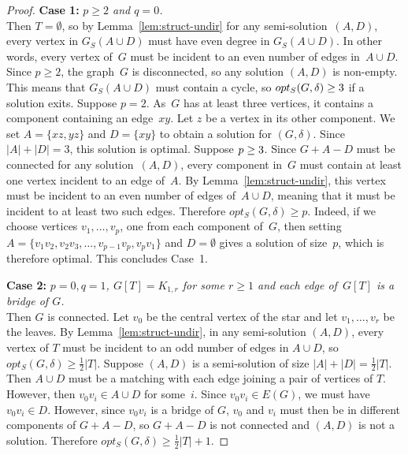 \documentclass[11pt]{llncs}
\newcommand{\opts}{opt_S}
\newcommand\displaycase[1]{{\bf #1}}
\begin{document}
\begin{proof}
\medskip
\noindent
\displaycase{Case 1:} {\em$p \geq 2$ and $q=0$.}\\
Then $T=\emptyset$, so by Lemma~\ref{lem:struct-undir} for any
semi-solution~$(A,D)$, every vertex in $G_S(A\cup D)$ must have even degree in
$G_S(A \cup D)$.  In other words, every vertex of~$G$ must be incident to an
even number of edges in~$A\cup D$.  Since $p \geq 2$, the graph~$G$ is
disconnected, so any solution $(A,D)$ is non-empty.  This means that
$G_S(A\cup D)$ must contain a cycle, so $\opts(G,\delta)\geq\nobreak 3$ if a solution
exits.
Suppose $p=2$. As~$G$ has at least three vertices, it contains a component containing an edge~$xy$. Let $z$ be a vertex in its
other component. We set $A=\{xz,yz\}$ and $D=\{xy\}$ to obtain a solution for $(G,\delta)$.
Since $|A|+|D|=3$, this solution is optimal. Suppose $p \geq\nobreak 3$. Since $G+A-D$ must be connected for any
solution~$(A,D)$, every component in~$G$ must contain at least one vertex
incident to an edge of~$A$. By Lemma~\ref{lem:struct-undir}, this vertex must
be incident to an even number of edges of~$A \cup D$, meaning that it must be
incident to at least two such edges. Therefore $\opts(G,\delta) \geq p$.
Indeed, if we choose vertices $v_1,\ldots,v_p$, one from each component of~$G$,
then setting $A=\{v_1v_2,v_2v_3,\ldots,v_{p-1}v_p,v_pv_1\}$ and $D=\emptyset$
gives a solution of size~$p$, which is therefore optimal.
This concludes Case~1.


\medskip
\noindent
\displaycase{Case 2:} {\em $p=0,q=1$, $G[T]=K_{1,r}$ for some $r\geq 1$ and each edge
of~$G[T]$ is a bridge of $G$.}\\
Then $G$ is connected.  Let $v_0$ be the central vertex of the star and
let $v_1,\ldots,v_r$ be the leaves.  By Lemma~\ref{lem:struct-undir}, in any
semi-solution $(A,D)$, every vertex of $T$ must be incident to an odd number of
edges in $A \cup D$, so $\opts(G,\delta) \geq \frac{1}{2}|T|$. Suppose $(A,D)$
is a semi-solution of size $|A|+|D|=\frac{1}{2}|T|$. Then $A \cup D$ must be a
matching with each edge joining a pair of vertices of $T$. However, then
$v_0v_i \in A \cup D$ for some~$i$. Since $v_0v_i \in E(G)$, we must have
$v_0v_i \in D$. However, since $v_0v_i$ is a bridge of $G$, $v_0$ and $v_i$
must then be in different components of $G+A-D$, so $G+A-D$ is not connected
and $(A,D)$ is not a solution.  Therefore $\opts(G,\delta) \geq
\frac{1}{2}|T|+1$.


\end{proof}
\end{document}

